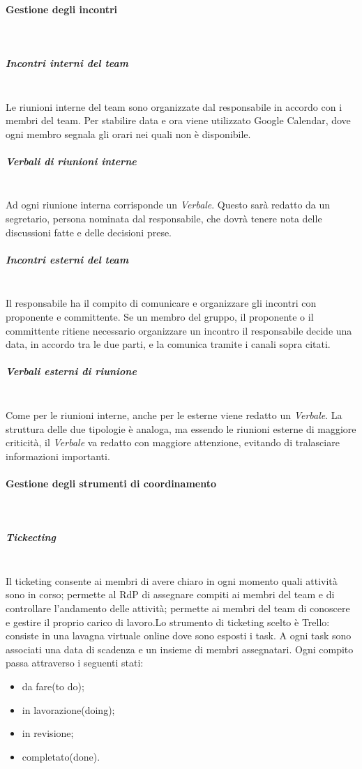 			\paragraph{Gestione degli incontri} \mbox{}\\
			\subparagraph{Incontri interni del team} \mbox{}\\
			Le riunioni interne del team sono organizzate dal responsabile in accordo con i membri del team. Per stabilire data e ora viene utilizzato Google Calendar, dove ogni membro segnala gli orari nei quali non è disponibile.
			\subparagraph{Verbali di riunioni interne} \mbox{}\\
			Ad ogni riunione interna corrisponde un \textit{Verbale}. Questo sarà redatto da un segretario, persona nominata dal responsabile, che dovrà tenere nota delle discussioni fatte e delle decisioni prese. 
			\subparagraph{Incontri esterni del team} \mbox{}\\
			Il responsabile ha il compito di comunicare e organizzare gli incontri con proponente e committente. Se un membro del gruppo, il proponente o il committente ritiene necessario organizzare un incontro il responsabile decide una data, in accordo tra le due parti, e la comunica tramite i canali sopra citati.

			\subparagraph{Verbali esterni di riunione} \mbox{}\\
			Come per le riunioni interne, anche per le esterne viene redatto un \textit{Verbale}. La struttura delle due tipologie è analoga, ma essendo le riunioni esterne di maggiore criticità, il \textit{Verbale} va redatto con maggiore attenzione, evitando di tralasciare informazioni importanti.
			\paragraph{Gestione degli strumenti di coordinamento} \mbox{}\\
			\subparagraph{Tickecting} \mbox{}\\
			Il ticketing consente ai membri di avere chiaro in ogni momento quali attività sono in corso; permette al RdP di assegnare compiti ai membri del team e di controllare l'andamento delle attività; permette ai membri del team di conoscere e gestire il proprio carico di lavoro.\newline Lo strumento di ticketing scelto è Trello: consiste in una lavagna virtuale online dove sono esposti i task. A ogni task sono associati una data di scadenza e un insieme di membri assegnatari. Ogni compito passa attraverso i seguenti stati:
			\begin{itemize}
				\item da fare(to do);
				\item in lavorazione(doing);
				\item in revisione;

				\item completato(done).
			\end{itemize}

